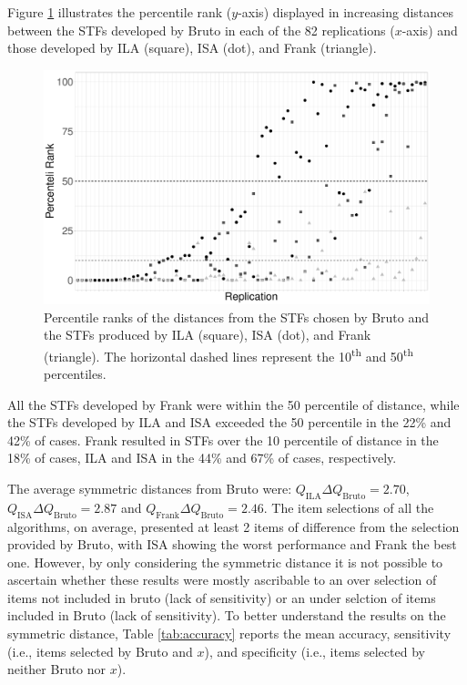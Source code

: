 \documentclass[12pt, a4paper, titilepage]{article}
\begin{document}
Figure \ref{fig:percentile-rank} illustrates the percentile rank ($y$-axis) displayed in increasing distances between the STFs developed by Bruto in each of the 82 replications ($x$-axis) and those developed by  ILA (square), ISA (dot), and Frank (triangle).

\begin{figure}[h]
	\centering
	\includegraphics[width=\linewidth]{img/precentile-rank}
	\caption{Percentile ranks of the distances from the STFs chosen by Bruto and the STFs produced by ILA (square), ISA (dot), and Frank (triangle). The horizontal dashed lines represent the 10\textsuperscript{th} and 50\textsuperscript{th} percentiles.}
	\label{fig:percentile-rank}
\end{figure}
All the STFs developed by Frank were within the 50 percentile of distance, while the STFs developed by ILA and ISA exceeded the 50 percentile in the 22\% and 42\% of cases. 
Frank resulted in STFs over the 10 percentile of distance in the 18\% of cases, ILA and ISA in the 44\% and 67\% of cases, respectively.


The average symmetric distances from Bruto were:  $Q_{\text{ILA}}\Delta Q_{\text{Bruto}} = 2.70$, $Q_{\text{ISA}}\Delta Q_{\text{Bruto}} = 2.87$ and $Q_{\text{Frank}} \Delta Q_{\text{Bruto}}= 2.46$. The item selections of all the algorithms, on average, presented at least 2 items of difference from the selection provided by Bruto, with ISA showing the worst performance and Frank the best one. However, by only considering the symmetric distance it is not possible to ascertain whether these results were mostly ascribable to an over selection of items not included in bruto (lack of sensitivity) or an under selction of items included in Bruto (lack of sensitivity).
To better understand the results on the symmetric distance, 
Table \ref{tab:accuracy} reports the mean accuracy, sensitivity (i.e., items selected by Bruto and $x$), and specificity (i.e., items selected by neither Bruto nor $x$). 
\end{document}
